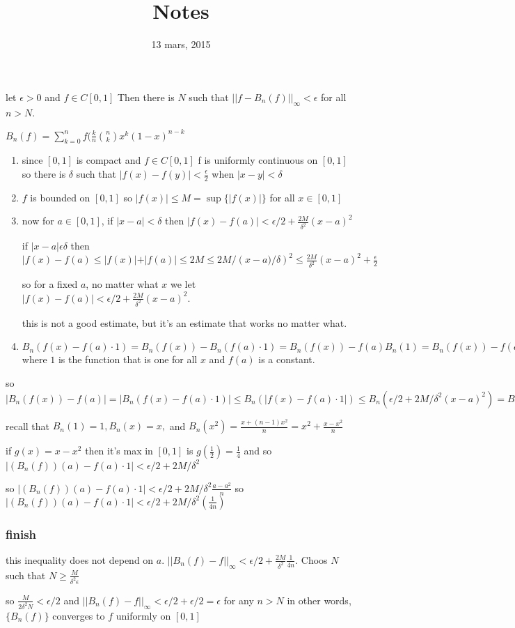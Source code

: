 \documentclass[letterpaper]{article}
\begin{document}
\title{Notes}
\date{13 mars, 2015}
\maketitle
let $\epsilon>0$ and $f\in C[0,1]$
Then there is $N$ such that $||f-B_n(f)||_\infty<\epsilon$ for all $n>N$.

$B_n(f)=\sum\limits_{k=0}^n{f(\frac{k}{n}\binom{n}{k}x^k(1-x)^{n-k}}$

\begin{enumerate}
\item
since $[0,1]$ is compact and $f\in C[0,1]$ f is uniformly continuous on $[0,1]$ so there is $\delta$ such that $|f(x)-f(y)|<\frac{\epsilon}{2}$ when $|x-y|< \delta$
\item
$f$ is bounded on $[0,1]$ so $|f(x)|\le M=\sup\{|f(x)|\}$ for all $x\in [0,1]$
\item
now for $a\in [0,1]$, if $|x-a|<\delta$ then $|f(x)-f(a)|<\epsilon/2+\frac{2M}{\delta^2}(x-a)^2$

if $|x-a|\epsilon \delta$ then $|f(x)-f(a)\le|f(x)|+|f(a)|\le 2M\le 2M/\left(x-a)/\delta\right)^2\le \frac{2M}{\delta^2}(x-a)^2+\frac{\epsilon}{2}$

so for a fixed $a$, no matter what $x$ we let $|f(x)-f(a)|<\epsilon/2+\frac{2M}{\delta^2}(x-a)^2$.

this is not a good estimate, but it's an estimate that works no matter what.

\item
$B_n(f(x)-f(a)\cdot 1)=B_n(f(x))-B_n(f(a)\cdot1)=B_n(f(x))-f(a)B_n(1)=B_n(f(x))-f(a)\cdot 1$ where $1$ is the function that is one for all $x$ and $f(a)$ is a constant.


\end{enumerate}

so $|B_n(f(x))-f(a)|=|B_n(f(x)-f(a)\cdot1)|\le B_n(|f(x)-f(a)\cdot 1|)\le B_n(\epsilon/2+2M/\delta^2(x-a)^2)=B_n(\epsilon/2)+2M/\delta^2B_n((x-a)^2)=\epsilon/2+2M/\delta^2[B_n(x^2-2ax+a^2]=\frac{\epsilon}{2}+2M/\delta^2(B_n(x^2)-2aB_n(x)+a^2)=\frac{\epsilon}{2}+\frac{2M}{\delta^2}((x^2+\frac{x-x^2}{n})-2a(x)+a^2$

recall that $B_n(1)=1, B_n(x)=x,$ and $B_n(x^2)=\frac{x+(n-1)x^2}{n}=x^2+\frac{x-x^2}{n}$

if $g(x)=x-x^2$ then it's max in $[0,1]$ is $g(\frac{1}{2})=\frac{1}{4}$ and so $|(B_n(f))(a)-f(a)\cdot 1|<\epsilon/2+2M/\delta^2$

so $|(B_n(f))(a)-f(a)\cdot 1|<\epsilon/2+2M/\delta^2\frac{a-a^2}{n}$ so $|(B_n(f))(a)-f(a)\cdot 1|<\epsilon/2+2M/\delta^2(\frac{1}{4n})$

\subsubsection*{finish}
this inequality does not depend on $a$. $||B_n(f)-f||_\infty<\epsilon/2+\frac{2M}{\delta^2}\frac{1}{4n}$. Choos $N$ such that $N\ge \frac{M}{\delta^2\epsilon}$

so $\frac{M}{2\delta^2N}<\epsilon/2$ and $||B_n(f)-f||_\infty<\epsilon/2+\epsilon/2=\epsilon$ for any $n>N$ in other words, $\{B_n(f)\}$ converges to $f$ uniformly on $[0,1]$
\end{document}

